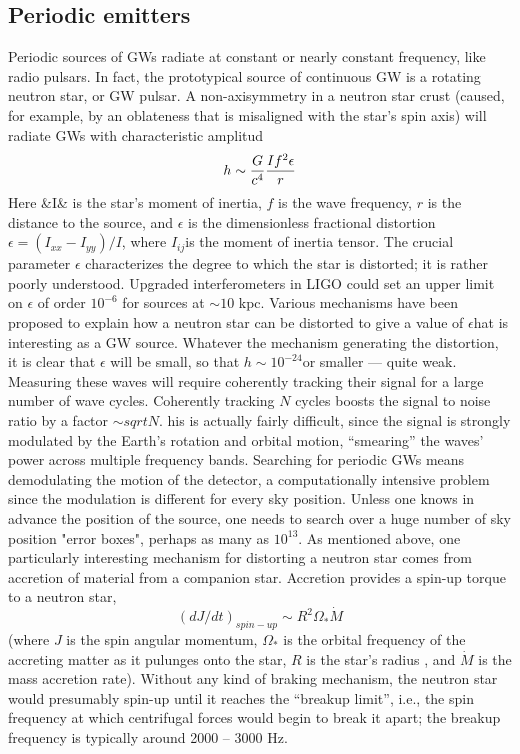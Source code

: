 \documentclass[binding=0.6cm, LaM]{sapthesis}
\begin{document}
\subsection{Periodic emitters}
Periodic sources of GWs radiate at constant or nearly constant frequency, like radio pulsars. 
In fact, the prototypical source of continuous GW is a rotating neutron star, or GW pulsar. A non-axisymmetry in a neutron star crust (caused, for example, by an oblateness that is misaligned with 
the star’s spin axis) will radiate GWs with characteristic amplitud
\begin{equation}
 h \sim {G \over c^4}{{If^2\epsilon}\over{r}}
\end{equation}
Here &I& is the star's moment of inertia, $f$ is the wave frequency, $r$ is the distance to the source, and $\epsilon$ is the dimensionless fractional distortion $\epsilon = (I_{xx}-I_{yy})/I$, 
where $I_{ij}$is the moment of inertia tensor. The crucial parameter $\epsilon$ characterizes the degree to which the star is distorted; it is rather poorly understood. 
Upgraded interferometers in LIGO could set an upper limit on  $\epsilon$ of order $10^{-6}$ for sources at $\sim10$ kpc. 
Various mechanisms have been proposed to explain how a neutron star can be distorted to give a value of $\epsilon$hat is interesting as a GW source.
Whatever the mechanism generating the distortion, it is clear that  $\epsilon$ will be small,
so that $h \sim 10^{-24}$or smaller — quite weak. Measuring these waves will require
coherently tracking their signal for a large number of wave cycles. Coherently tracking $N$ cycles boosts the signal to noise ratio by a factor $\sim sqrt{N}$.
his is actually fairly
 difficult, since the signal is strongly modulated by the Earth’s rotation and orbital
motion, “smearing” the waves’ power across multiple frequency bands. Searching for
periodic GWs means demodulating the motion of the detector, a computationally
intensive problem since the modulation is different for every sky position. Unless
one knows in advance the position of the source, one needs to search over a huge number of sky position "error boxes", perhaps as many as $10^13$.
As mentioned above, one particularly interesting mechanism for distorting a neutron star comes from accretion of material from a companion star. Accretion provides a spin-up torque to a neutron star,
\begin{equation}
(dJ/dt)_{spin-up} \sim R^2\Omega_* \dot M
\end{equation}
(where $J$  is the spin angular momentum, $\Omega_* $ is the orbital frequency of the accreting matter as it pulunges onto the star, $R$ is the star's radius , and $\dot M$ 
is the mass accretion rate).
Without any kind of braking mechanism, the neutron star would presumably spin-up until it reaches the “breakup limit”, i.e., the spin frequency at which centrifugal forces would begin to break it 
apart; the breakup frequency is typically around 2000 – 3000 Hz.
\end{document}
